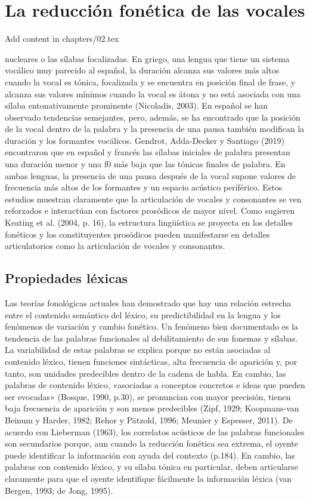 \chapter{La reducción fonética de las vocales}
Add content in chapters/02.tex

nucleares o las sílabas focalizadas. En griego, una lengua que tiene un sistema vocálico muy parecido al español, la duración alcanza sus valores más altos cuando la vocal es tónica, focalizada y se encuentra en posición final de frase, y alcanza sus valores mínimos cuando la vocal es átona y no está asociada con una sílaba entonativamente prominente (Nicoladis, 2003). En español se han observado tendencias semejantes, pero, además, se ha encontrado que la posición de la vocal dentro de la palabra y la presencia de una pausa también modifican la duración y los formantes vocálicos. Gendrot, Adda-Decker y Santiago (2019) encontraron que en español y francés las sílabas iniciales de palabra presentan una duración menor y una f0 más baja que las tónicas finales de palabra. En ambas lenguas, la presencia de una pausa después de la vocal supone valores de frecuencia más altos de los formantes y un espacio acústico periférico. Estos estudios muestran claramente que la articulación de vocales y consonantes se ven reforzados e interactúan con factores prosódicos de mayor nivel. Como sugieren Keating et al. (2004, p. 16), la estructura lingüística se proyecta en los detalles fonéticos y los constituyentes prosódicos pueden manifestarse en detalles articulatorios como la articulación de vocales y consonantes.

\section{Propiedades léxicas}

Las teorías fonológicas actuales han demostrado que hay una relación estrecha entre el contenido semántico del léxico, su predictibilidad en la lengua y los fenómenos de variación y cambio fonético. Un fenómeno bien documentado es la tendencia de las palabras funcionales al debilitamiento de sus fonemas y sílabas. La variabilidad de estas palabras se explica porque no están asociadas al contenido léxico, tienen funciones sintácticas, alta frecuencia de aparición y, por tanto, son unidades predecibles dentro de la cadena de habla. En cambio, las palabras de contenido léxico, «asociadas a conceptos concretos e ideas que pueden ser evocadas» (Bosque, 1990, p.30), se pronuncian con mayor precisión, tienen baja frecuencia de aparición y son menos predecibles (Zipf, 1929; Koopmans-van Beinum y Harder, 1982; Rehor y Pätzold, 1996; Meunier y Espesser, 2011). De acuerdo con Lieberman (1963), los correlatos acústicos de las palabras funcionales son secundarios porque, aun cuando la reducción fonética sea extrema, el oyente puede identificar la información con ayuda del contexto (p.184). En cambio, las palabras con contenido léxico, y su sílaba tónica en particular, deben articularse claramente para que el oyente identifique fácilmente la información léxica (van Bergen, 1993; de Jong, 1995).

